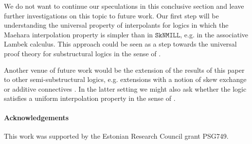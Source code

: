 \documentclass[sn-mathphys-num]{sn-jnl}%
\newcommand{\SkNMILL}{$\mathtt{SkNMILL}$}
\theoremstyle{thmstyleone}%
\theoremstyle{thmstyletwo}%
\theoremstyle{thmstylethree}%
\begin{document}
We do not want to continue our speculations in this conclusive section and leave further investigations on this topic to future work.
Our first step will be understanding the universal property of interpolants for logics in which the Maehara interpolation property is simpler than in \SkNMILL, e.g. in the associative Lambek calculus. 
This approach could be seen as a step towards the universal proof theory for substructural logics in the sense of \cite{Tabatabai2025}.

Another venue of future work would be the  extension of the results of this paper to other semi-substructural logics, e.g. extensions with a notion of skew exchange \cite{veltri:coherence:2024} or additive connectives \cite{VW:2023}.
In the latter setting we might also ask whether the logic satisfies a uniform interpolation property in the sense of \cite{alizadeh:2014}.

\paragraph{Acknowledgements}
This work was supported by the Estonian Research Council grant PSG749.







\end{document}
